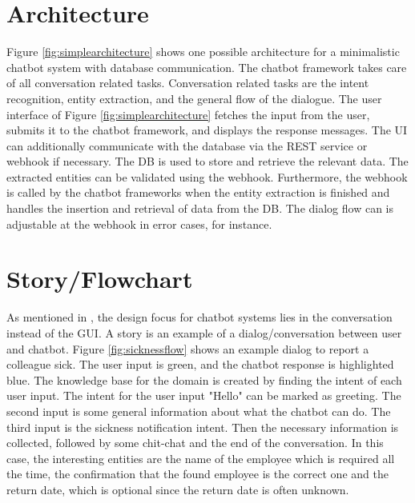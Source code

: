 \section{Architecture}

Figure \ref{fig:simplearchitecture} shows one possible architecture for a minimalistic chatbot system with database communication.
The chatbot framework takes care of all conversation related tasks. 
Conversation related tasks are the intent recognition, entity extraction, and the general flow of the dialogue. 
The user interface of Figure \ref{fig:simplearchitecture} fetches the input from the user, submits it to the chatbot framework, and displays the response messages. 
The UI can additionally communicate with the database via the REST service or webhook if necessary.
The DB is used to store and retrieve the relevant data.
The extracted entities can be validated using the webhook.
Furthermore, the webhook is called by the chatbot frameworks when the entity extraction is finished and handles the insertion and retrieval of data from the DB.
The dialog flow can is adjustable at the webhook in error cases, for instance.

 \section{Story/Flowchart}
 As mentioned in \citet{folstad2017chatbots}, the design focus for chatbot systems lies in the conversation instead of the GUI.
 A story is an example of a dialog/conversation between user and chatbot.
Figure \ref{fig:sicknessflow} shows an example dialog to report a colleague sick.
The user input is green, and the chatbot response is highlighted blue.
The knowledge base for the domain is created by finding the intent of each user input.
 The intent for the user input "Hello" can be marked as greeting.
The second input is some general information about what the chatbot can do. 
The third input is the sickness notification intent. 
Then the necessary information is collected, followed by some chit-chat and the end of the conversation. 
 In this case, the interesting entities are the name of the employee which is required all the time, the confirmation that the found employee is the 
 correct one and the return date, which is optional since the return date is often unknown.

